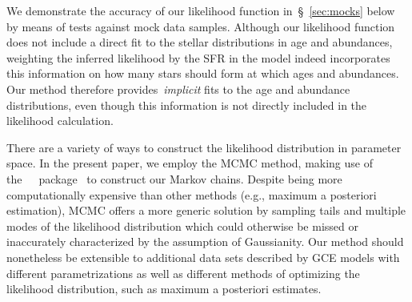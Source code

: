 \documentclass[foo.tex]{subfiles}
\begin{document}
We demonstrate the accuracy of our likelihood function in~\S~\ref{sec:mocks}
below by means of tests against mock data samples.
Although our likelihood function does not include a direct fit to the
stellar distributions in age and abundances, weighting the inferred likelihood
by the SFR in the model indeed incorporates this information on how many stars
should form at which ages and abundances.
Our method therefore provides~\textit{implicit} fits to the age and abundance
distributions, even though this information is not directly included in the
likelihood calculation.
\par
There are a variety of ways to construct the likelihood distribution in
parameter space.
In the present paper, we employ the MCMC method, making use of
the~\mc~\python~package~\citep{ForemanMackey2013} to construct our Markov
chains.
Despite being more computationally expensive than other methods (e.g.,
maximum a posteriori estimation), MCMC offers a more generic solution by
sampling tails and multiple modes of the likelihood distribution which could
otherwise be missed or inaccurately characterized by the assumption of
Gaussianity.
Our method should nonetheless be extensible to additional data sets described
by GCE models with different parametrizations as well as different methods of
optimizing the likelihood distribution, such as maximum a posteriori estimates.
\end{document}
